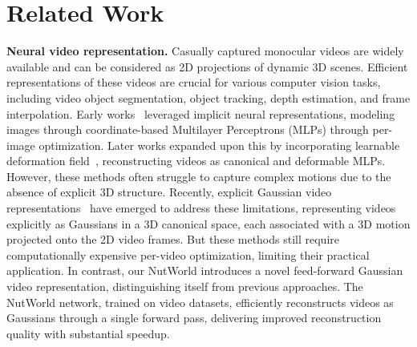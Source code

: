 \section{Related Work}


\noindent\textbf{Neural video representation.}  
Casually captured monocular videos are widely available and can be considered as 2D projections of dynamic 3D scenes. Efficient representations of these videos are crucial for various computer vision tasks, including video object segmentation, object tracking, depth estimation, and frame interpolation.
%
Early works~\cite{chen2021learning, sitzmann2020implicit, tancik2020fourier, ouyang2024codef} leveraged implicit neural representations, modeling images through coordinate-based Multilayer Perceptrons (MLPs) through per-image optimization. Later works expanded upon this by incorporating learnable deformation field~\cite{ouyang2024codef, wang2023tracking, liu2023robust, ye2022deformable}, reconstructing videos as canonical and deformable MLPs. However, these methods often struggle to capture complex motions due to the absence of explicit 3D structure. Recently, explicit Gaussian video representations~\cite{som2024, sun2024splatter, wang2024gflow, lei2024mosca} have emerged to address these limitations, representing videos explicitly as Gaussians in a 3D canonical space, each associated with a 3D motion projected onto the 2D video frames. But these methods still require computationally expensive per-video optimization, limiting their practical application.
%
In contrast, our NutWorld introduces a novel feed-forward Gaussian video representation, distinguishing itself from previous approaches. The NutWorld network, trained on video datasets, efficiently reconstructs videos as Gaussians through a single forward pass, delivering improved reconstruction quality with substantial speedup.





